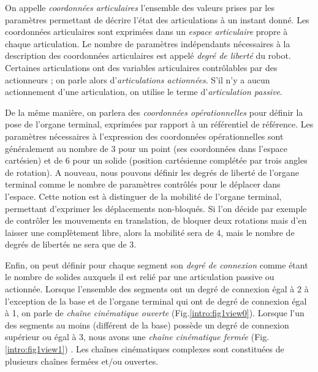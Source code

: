 On appelle {\it coordonnées articulaires} l'ensemble des valeurs prises par les 
paramètres permettant de décrire l'état des articulations à un instant donné. 
Les coordonnées articulaires sont exprimées dans un {\it espace articulaire} 
propre à chaque articulation. Le nombre de paramètres ind\'ependants 
nécessaires à la description des coordonnées articulaires est appelé {\it degré 
de liberté} du robot. Certaines articulations ont des variables articulaires 
contr\^olables par des actionneurs ; on parle alors d'{\it articulations 
actionn\'ees}. S'il n'y a aucun actionnement d'une articulation, on utilise le 
terme d'{\it articulation passive}.

De la même manière, on parlera des {\it coordonnées opérationnelles} pour 
définir la pose de l'organe terminal, exprimées par rapport à un référentiel de 
référence. Les paramètres nécessaires à l'expression des coordonnées 
opérationnelles sont généralement au nombre de 3 pour un point (ses coordonnées 
dans l'espace cartésien) et de 6 pour un solide (position cartésienne complétée 
par trois angles de rotation). A nouveau, nous pouvons définir les degrés de 
liberté de l'organe terminal comme le nombre de paramètres contr\^olés pour le 
déplacer dans l'espace. Cette notion est à distinguer de la mobilité de l'organe 
terminal, permettant d'exprimer les déplacements non-bloqués. Si l'on décide par 
exemple de contr\^oler les mouvements en translation, de bloquer deux rotations 
mais d'en laisser une complètement libre, alors la mobilité sera de 4, mais le 
nombre de degrés de libertés ne sera que de 3.

Enfin, on peut définir pour chaque segment son {\it degré de connexion} comme 
étant le nombre de solides auxquels il est relié par une articulation passive 
ou actionnée. Lorsque l'ensemble des segments ont un degré de connexion égal à 2 
à l'exception de la base et de l'organe terminal qui ont de degré de connexion 
égal à 1, on parle de {\it cha\^ine cinématique ouverte} 
(Fig.\ref{intro:fig1view0}). Lorsque l'un des segments au moins (différent de 
la base) possède un degré de connexion supérieur ou égal à 3, nous avons une 
{\it cha\^ine cinématique fermée} (Fig.\ref{intro:fig1view1}) 
\cite{journals/gosselin1989}. Les cha\^ines cinématiques complexes sont 
constituées de plusieurs cha\^ines fermées et/ou ouvertes.


